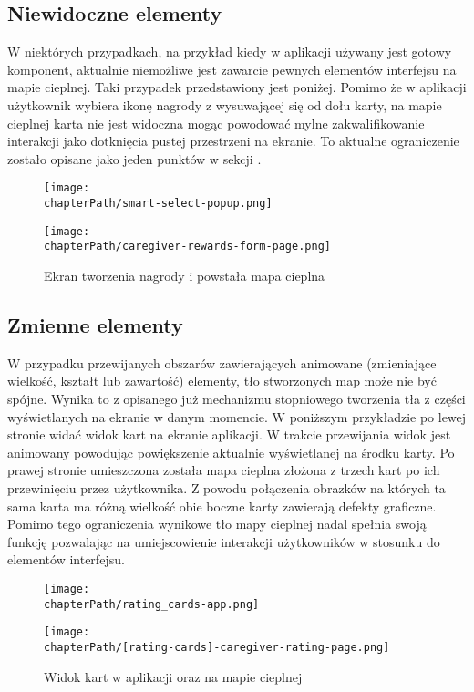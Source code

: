 \subsection{Niewidoczne elementy}
W niektórych przypadkach, na przykład kiedy w aplikacji używany jest gotowy komponent, aktualnie niemożliwe jest zawarcie pewnych elementów interfejsu na mapie cieplnej. Taki przypadek przedstawiony jest poniżej. Pomimo że w aplikacji użytkownik wybiera ikonę nagrody z wysuwającej się od dołu karty, na mapie cieplnej karta nie jest widoczna mogąc powodować mylne zakwalifikowanie interakcji jako dotknięcia pustej przestrzeni na ekranie. To aktualne ograniczenie zostało opisane jako jeden punktów w sekcji .

\bigskip
\begin{figure}[H]
\centering
\begin{minipage}{.3\textwidth}
	\centering
	\texttt{[image: \\chapterPath/smart-select-popup.png]}
\end{minipage}
\begin{minipage}{.3\textwidth}
	\centering
	\texttt{[image: \\chapterPath/caregiver-rewards-form-page.png]}
\end{minipage}
\bigskip
\caption{Ekran tworzenia nagrody i powstała mapa cieplna}
\label{fig:rs_reward_form}
\end{figure}

\subsection{Zmienne elementy}
W przypadku przewijanych obszarów zawierających animowane (zmieniające wielkość, kształt lub zawartość) elementy, tło stworzonych map może nie być spójne. Wynika to z opisanego już mechanizmu stopniowego tworzenia tła z części wyświetlanych na ekranie w danym momencie. W poniższym przykładzie po lewej stronie widać widok kart na ekranie aplikacji. W trakcie przewijania widok jest animowany powodując powiększenie aktualnie wyświetlanej na środku karty. Po prawej stronie umieszczona została mapa cieplna złożona z trzech kart po ich przewinięciu przez użytkownika. Z powodu połączenia obrazków na których ta sama karta ma różną wielkość obie boczne karty zawierają defekty graficzne. Pomimo tego ograniczenia wynikowe tło mapy cieplnej nadal spełnia swoją funkcję pozwalając na umiejscowienie interakcji użytkowników w stosunku do elementów interfejsu.

\bigskip
\begin{figure}[H]
\begin{minipage}{.25\textwidth}
	\centering
	\texttt{[image: \\chapterPath/rating\_cards-app.png]}
\end{minipage}
\begin{minipage}{.74\textwidth}
	\centering
	\texttt{[image: \\chapterPath/[rating-cards]-caregiver-rating-page.png]}
\end{minipage}
\bigskip
\caption{Widok kart w aplikacji oraz na mapie cieplnej}
\label{fig:rs_rating_cards}
\end{figure}
